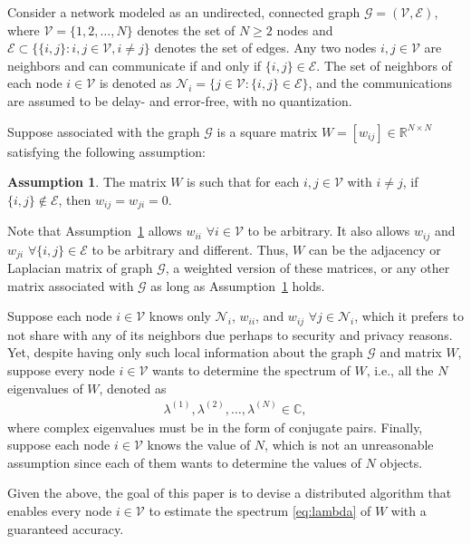 \documentclass[11pt]{article}
\theoremstyle{plain}
\theoremstyle{definition}
\newtheorem{assumption}{Assumption}
\theoremstyle{remark}
\begin{document}
Consider a network modeled as an undirected, connected graph $\mathcal{G}=(\mathcal{V},\mathcal{E})$, where $\mathcal{V}=\{1,2,\ldots,N\}$ denotes the set of $N\ge2$ nodes and $\mathcal{E}\subset\{\{i,j\}:i,j\in\mathcal{V},i\ne j\}$ denotes the set of edges. Any two nodes $i,j\in\mathcal{V}$ are neighbors and can communicate if and only if $\{i,j\}\in\mathcal{E}$. The set of neighbors of each node $i\in\mathcal{V}$ is denoted as $\mathcal{N}_i=\{j\in\mathcal{V}:\{i,j\}\in\mathcal{E}\}$, and the communications are assumed to be delay- and error-free, with no quantization.

Suppose associated with the graph $\mathcal{G}$ is a square matrix $W=[w_{ij}]\in\mathbb{R}^{N\times N}$ satisfying the following assumption:

\begin{assumption}\label{asm:W}
The matrix $W$ is such that for each $i,j\in\mathcal{V}$ with $i\ne j$, if $\{i,j\}\notin\mathcal{E}$, then $w_{ij}=w_{ji}=0$.
\end{assumption}

Note that Assumption~\ref{asm:W} allows $w_{ii}$ $\forall i\in\mathcal{V}$ to be arbitrary. It also allows $w_{ij}$ and $w_{ji}$ $\forall\{i,j\}\in\mathcal{E}$ to be arbitrary and different. Thus, $W$ can be the adjacency or Laplacian matrix of graph $\mathcal{G}$, a weighted version of these matrices, or any other matrix associated with $\mathcal{G}$ as long as Assumption~\ref{asm:W} holds.

Suppose each node $i\in\mathcal{V}$ knows only $\mathcal{N}_i$, $w_{ii}$, and $w_{ij}$ $\forall j\in\mathcal{N}_i$, which it prefers to not share with any of its neighbors due perhaps to security and privacy reasons. Yet, despite having only such local information about the graph $\mathcal{G}$ and matrix $W$, suppose every node $i\in\mathcal{V}$ wants to determine the spectrum of $W$, i.e., all the $N$ eigenvalues of $W$, denoted as
\begin{align}
\lambda^{(1)},\lambda^{(2)},\ldots,\lambda^{(N)}\in\mathbb{C},\label{eq:lambda}
\end{align}
where complex eigenvalues must be in the form of conjugate pairs. Finally, suppose each node $i\in\mathcal{V}$ knows the value of $N$, which is not an unreasonable assumption since each of them wants to determine the values of $N$ objects.

Given the above, the goal of this paper is to devise a distributed algorithm that enables every node $i\in\mathcal{V}$ to estimate the spectrum \eqref{eq:lambda} of $W$ with a guaranteed accuracy.
\end{document}
